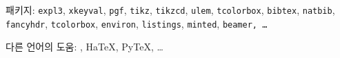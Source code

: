 \begin{frame}[fragile]
  \vspace{1em}
  패키지: \texttt{expl3}, \texttt{xkeyval}, \texttt{pgf}, \texttt{tikz}, \texttt{tikzcd}, \texttt{ulem}, \texttt{tcolorbox}, \texttt{bibtex}, \texttt{natbib}, \texttt{fancyhdr}, \texttt{tcolorbox}, \texttt{environ}, \texttt{listings}, \texttt{minted}, \texttt{beamer, \dots}

  \vspace{1em} 다른 언어의 도움: \LuaLaTeX, HaTeX, PyTeX, \dots
\end{frame}